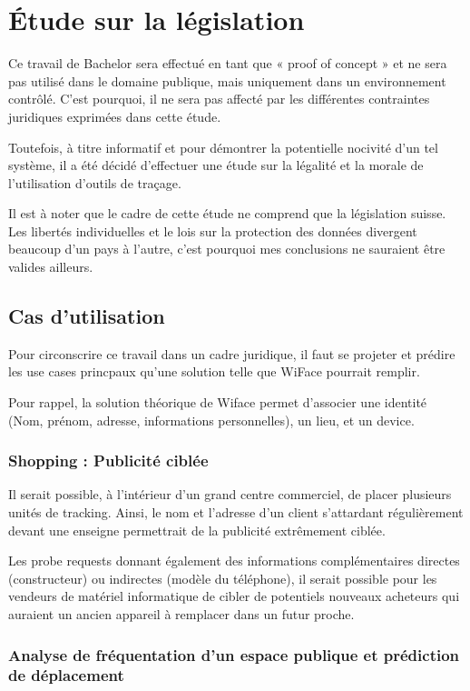 \chapter{Étude sur la législation}
\label{ch:etudelegislation}

Ce travail de Bachelor sera effectué en tant que « proof of concept » et ne sera pas utilisé dans le domaine publique,
mais uniquement dans un environnement contrôlé. C’est pourquoi, il ne sera pas affecté par les différentes
contraintes juridiques exprimées dans cette étude.

Toutefois, à titre informatif et pour démontrer la potentielle nocivité d’un tel système, il a été décidé d’effectuer
une étude sur la légalité et la morale de l’utilisation d’outils de traçage.

Il est à noter que le cadre de cette étude ne comprend que la législation suisse. Les libertés individuelles et le lois sur la protection des données divergent beaucoup
d'un pays à l'autre, c'est pourquoi mes conclusions ne sauraient être valides ailleurs. 

\section{Cas d’utilisation}
Pour circonscrire ce travail dans un cadre juridique, il faut se projeter et prédire les use cases princpaux qu’une
solution telle que WiFace pourrait remplir.

Pour rappel, la solution théorique de Wiface permet d’associer une identité (Nom, prénom, adresse, informations
personnelles), un lieu, et un device.

\subsection{Shopping : Publicité ciblée}

Il serait possible, à l’intérieur d’un grand centre commerciel, de placer plusieurs unités de tracking. Ainsi, le nom et
l’adresse d’un client s’attardant régulièrement devant une enseigne permettrait de la publicité extrêmement ciblée.

Les probe requests donnant également des informations complémentaires directes (constructeur) ou indirectes
(modèle du téléphone), il serait possible pour les vendeurs de matériel informatique de cibler de potentiels nouveaux
acheteurs qui auraient un ancien appareil à remplacer dans un futur proche.

\subsection{Analyse de fréquentation d’un espace publique et prédiction de déplacement}

